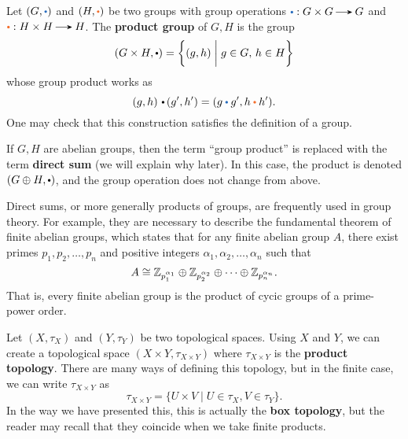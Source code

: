     \begin{example}
        Let $(G, \textcolor{NavyBlue}{\bigcdot})$ and $(H, \textcolor{Orange}{\bigcdot})$
        be two groups with group operations $\textcolor{NavyBlue}{\bigcdot}: G \times G \to G $
        and $\textcolor{Orange}{\bigcdot}:  H \times H \to H$. The \textbf{product group} 
        of $G,H$ is the group 
        \[
            (G \times H, \bigcdot) = \bigg\{(g, h) \;\bigg|\; g \in G, \, h \in H \bigg\}
        \]
        whose group product works as 
        \[
            (g, h) \, \bigcdot \, (g', h') = (g \mathbin{\textcolor{NavyBlue}{\bigcdot}} g', h \mathbin{\textcolor{Orange}{\bigcdot}} h').
        \]
        One may check that this construction satisfies the definition of a group. 

        If $G, H$ are abelian groups, then the term ``group product'' is replaced 
        with the term \textbf{direct sum} (we will explain why later). In this case, the 
        product is denoted  $(G \oplus H, \bigcdot)$, and the group operation does not 
        change from above. 

        Direct sums, or more generally products of groups, are frequently used in group  
        theory. For example, they are necessary to describe the fundamental theorem 
        of finite abelian groups, which states that for any finite abelian group $A$, 
        there exist primes $p_1, p_2, \dots, p_n$ and positive integers $\alpha_1, \alpha_2, \dots, \alpha_n$ 
        such that 
        \[
            A \cong \mathbb{Z}_{p^{\alpha_1}_1}\oplus \mathbb{Z}_{p^{\alpha_2}_2} \oplus \cdots \oplus \mathbb{Z}_{p^{\alpha_n}_n}.
        \]
        That is, every finite abelian group is the product of cycic groups of a prime-power 
        order. 
    \end{example}

    \begin{example}        
        Let $(X, \tau_X)$ and $(Y, \tau_Y)$ be two topological spaces.
        Using $X$ and $Y$, we can create a topological space $(X \times Y, \tau_{X \times Y})$
        where $\tau_{X\times Y}$ is the \textbf{product topology}. There are many ways of 
        defining this topology, but in the finite case, we can write 
        $\tau_{X\times Y}$ as
        \[
            \tau_{X\times Y}  = \bigg\{ U \times V \;\bigg|\; U \in \tau_X, V \in \tau_Y \bigg\} . 
        \]
        In the way we have presented this, this is actually the \textbf{box topology}, but the 
        reader may recall that they coincide when we take finite products. 

    \end{example}

